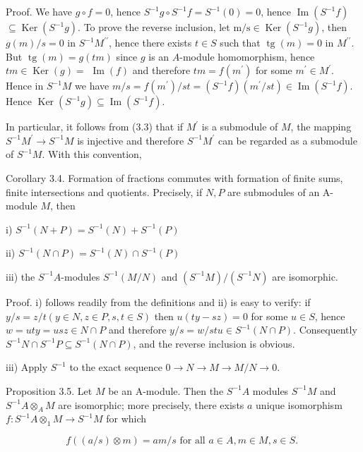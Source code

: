 \documentclass{standalone}
\theoremstyle{definition}
\theoremstyle{remark}
\begin{document}
Proof. We have $g \circ f=0$, hence $S^{-1} g \circ S^{-1} f=S^{-1}(0)=0$, hence $\operatorname{Im}\left(S^{-1} f\right)$ $\subseteq \operatorname{Ker}\left(S^{-1} g\right)$. To prove the reverse inclusion, let $\mathrm{m} / \mathrm{s} \in \operatorname{Ker}\left(S^{-1} g\right)$, then $g(m) / s=0$ in $S^{-1} M^{\prime \prime}$, hence there exists $t \in S$ such that $\operatorname{tg}(m)=0$ in $M^{\prime \prime}$. But $\operatorname{tg}(m)=g(t m)$ since $g$ is an $A$-module homomorphism, hence $t m \in \operatorname{Ker}(g)=$ $\operatorname{Im}(f)$ and therefore $t m=f\left(m^{\prime}\right)$ for some $m^{\prime} \in M^{\prime}$. Hence in $S^{-1} M$ we have $m / s=f\left(m^{\prime}\right) / s t=\left(S^{-1} f\right)\left(m^{\prime} / s t\right) \in \operatorname{Im}\left(S^{-1} f\right)$. Hence $\operatorname{Ker}\left(S^{-1} g\right) \subseteq \operatorname{Im}\left(S^{-1} f\right)$.

In particular, it follows from (3.3) that if $M^{\prime}$ is a submodule of $M$, the mapping $S^{-1} M^{\prime} \rightarrow S^{-1} M$ is injective and therefore $S^{-1} M^{\prime}$ can be regarded as a submodule of $S^{-1} M$. With this convention,

Corollary 3.4. Formation of fractions commutes with formation of finite sums, finite intersections and quotients. Precisely, if $N, P$ are submodules of an A-module $M$, then

i) $S^{-1}(N+P)=S^{-1}(N)+S^{-1}(P)$

ii) $S^{-1}(N \cap P)=S^{-1}(N) \cap S^{-1}(P)$

iii) the $S^{-1} A$-modules $S^{-1}(M / N)$ and $\left(S^{-1} M\right) /\left(S^{-1} N\right)$ are isomorphic.

Proof. i) follows readily from the definitions and ii) is easy to verify: if $y / s=z / t(y \in N, z \in P, s, t \in S)$ then $u(t y-s z)=0$ for some $u \in S$, hence $w=u t y=u s z \in N \cap P$ and therefore $y / s=w / s t u \in S^{-1}(N \cap P)$. Consequently $S^{-1} N \cap S^{-1} P \subseteq S^{-1}(N \cap P)$, and the reverse inclusion is obvious.

iii) Apply $S^{-1}$ to the exact sequence $0 \rightarrow N \rightarrow M \rightarrow M / N \rightarrow 0$.

Proposition 3.5. Let $M$ be an A-module. Then the $S^{-1} A$ modules $S^{-1} M$ and $S^{-1} A \otimes_{A} M$ are isomorphic; more precisely, there exists $a$ unique isomorphism $f: S^{-1} A \otimes_{1} M \rightarrow S^{-1} M$ for which

\[
f((a / s) \otimes m)=a m / s \text { for all } a \in A, m \in M, s \in S \text {. }
\]
\end{document}
